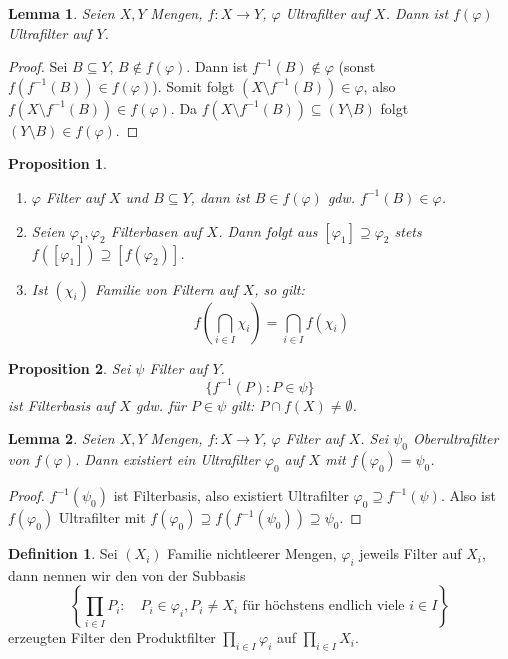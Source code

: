 \documentclass[12pt]{scrartcl}%
\newtheorem{prop}{Proposition}
\newtheorem{lemma}{Lemma}
\theoremstyle{definition}
\newtheorem*{defn}{Definition}
\theoremstyle{remark}
\begin{document}
\begin{lemma}
    Seien $X,Y$ Mengen, $f:X\to Y$, $\varphi$ Ultrafilter auf $X$. Dann ist $f(\varphi)$ Ultrafilter auf $Y$.
\end{lemma}

\begin{proof}
    Sei $B\subseteq Y$, $B\not\in f(\varphi)$. Dann ist $f^{-1}(B)\not\in \varphi$ (sonst $f(f^{-1}(B))\in f(\varphi)$). Somit folgt $(X\setminus f^{-1}(B))\in \varphi$, also $f(X\setminus f^{-1}(B))\in f(\varphi)$. Da $f(X\setminus f^{-1}(B)) \subseteq (Y\setminus B)$ folgt $(Y\setminus B) \in f(\varphi)$.
\end{proof}

\begin{prop}
    \begin{enumerate}[label=(\arabic*)]
        \item $\varphi$ Filter auf $X$ und $B\subseteq Y$, dann ist $B\in f(\varphi)$ gdw. $f^{-1}(B)\in\varphi$.
        \item Seien $\varphi_1,\varphi_2$ Filterbasen auf $X$. Dann folgt aus $[\varphi_1]\supseteq \varphi_2$ stets $f([\varphi_1]) \supseteq [f(\varphi_2)]$.
        \item Ist $(\chi_i)$ Familie von Filtern auf $X$, so gilt: $$f\left(\bigcap_{i\in I} \chi_i\right)=\bigcap_{i\in I} f(\chi_i)$$
    \end{enumerate}
\end{prop}

\begin{prop}
    Sei $\psi$ Filter auf $Y$. $$\{f^{-1}(P): P\in\psi\}$$ ist Filterbasis auf $X$ gdw. für $P\in\psi$ gilt: $P\cap f(X)\neq \emptyset$.
\end{prop}

\begin{lemma}
    Seien $X,Y$ Mengen, $f:X\to Y$, $\varphi$ Filter auf $X$. Sei $\psi_0$ Oberultrafilter von $f(\varphi)$. Dann existiert ein Ultrafilter $\varphi_0$ auf $X$ mit $f(\varphi_0)=\psi_0$.
\end{lemma}

\begin{proof}
    $f^{-1}(\psi_0)$ ist Filterbasis, also existiert Ultrafilter $\varphi_0\supseteq f^{-1}(\psi)$. Also ist $f(\varphi_0)$ Ultrafilter mit $f(\varphi_0)\supseteq f(f^{-1}(\psi_0)) \supseteq \psi_0$.
\end{proof}

\begin{defn}
    Sei $(X_i)$ Familie nichtleerer Mengen, $\varphi_i$ jeweils Filter auf $X_i$, dann nennen wir den von der Subbasis $$\left\{ \prod_{i\in I} P_i: \quad P_i\in\varphi_i, P_i \neq X_i \text{ für höchstens endlich viele } i\in I\right\}$$ erzeugten Filter den Produktfilter $\prod_{i\in I} \varphi_i$ auf $\prod_{i\in I} X_i$.
\end{defn}
\end{document}
